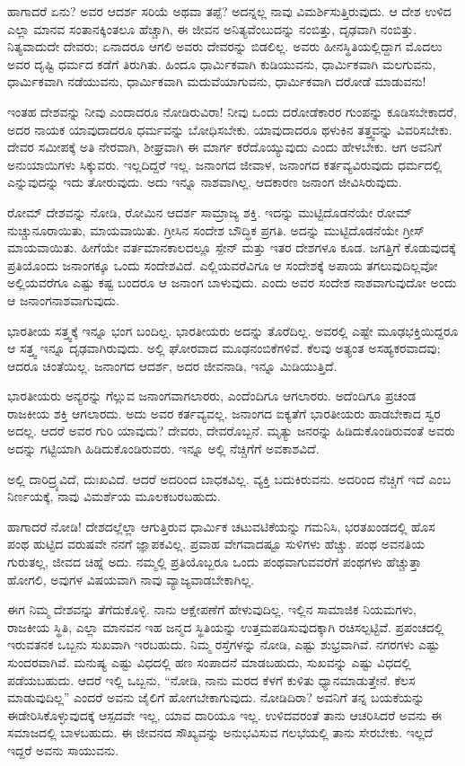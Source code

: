 ಹಾಗಾದರೆ ಏನು? ಅವರ ಆದರ್ಶ ಸರಿಯೆ ಅಥವಾ ತಪ್ಪೆ? ಅದನ್ನಲ್ಲ ನಾವು ವಿಮರ್ಶಿಸುತ್ತಿರುವುದು. ಆ ದೇಶ ಉಳಿದ ಎಲ್ಲಾ ಮಾನವ ಸಂತಾನಕ್ಕಿಂತಲೂ ಹೆಚ್ಚಾಗಿ, ಈ ಜೀವನ ಅನಿತ್ಯವೆಂಬುದನ್ನು ನಂಬಿತ್ತು, ದೃಢವಾಗಿ ನಂಬಿತ್ತು. ನಿತ್ಯವಾದುದೇ ದೇವರು; ಏನಾದರೂ ಆಗಲಿ ಅವರು ದೇವರನ್ನು ಬಿಡಲಿಲ್ಲ. ಅವರು ಹೀನಸ್ಥಿತಿಯಲ್ಲಿದ್ದಾಗ ಮೊದಲು ಅವರ ದೃಷ್ಟಿ ಧರ್ಮದ ಕಡೆಗೆ ತಿರುಗಿತು. ಹಿಂದೂ ಧಾರ್ಮಿಕವಾಗಿ ಕುಡಿಯುವನು, ಧಾರ್ಮಿಕವಾಗಿ ಮಲಗುವನು, ಧಾರ್ಮಿಕವಾಗಿ ನಡೆಯುವನು, ಧಾರ್ಮಿಕವಾಗಿ ಮದುವೆಯಾಗುವನು, ಧಾರ್ಮಿಕವಾಗಿ ದರೋಡೆ ಮಾಡುವನು!

ಇಂತಹ ದೇಶವನ್ನು ನೀವು ಎಂದಾದರೂ ನೋಡಿರುವಿರಾ! ನೀವು ಒಂದು ದರೋಡೆಕಾರರ ಗುಂಪನ್ನು ಕೂಡಿಸಬೇಕಾದರೆ, ಅದರ ನಾಯಕ ಯಾವುದಾದರೂ ಧರ್ಮವನ್ನು ಬೋಧಿಸಬೇಕು. ಯಾವುದಾದರೂ ಥಳುಕಿನ ತತ್ತ್ವವನ್ನು ವಿವರಿಸಬೇಕು. ದೇವರ ಸಮೀಪಕ್ಕೆ ಅತಿ ನೇರವಾಗಿ, ಶೀಘ್ರವಾಗಿ ಈ ಮಾರ್ಗ ಕರೆದೊಯ್ಯುವುದು ಎಂದು ಹೇಳಬೇಕು. ಆಗ ಅವನಿಗೆ ಅನುಯಾಯಿಗಳು ಸಿಕ್ಕುವರು. ಇಲ್ಲದಿದ್ದರೆ ಇಲ್ಲ. ಜನಾಂಗದ ಜೀವಾಳ, ಜನಾಂಗದ ಕರ್ತವ್ಯವಿರುವುದು ಧರ್ಮದಲ್ಲಿ ಎನ್ನುವುದನ್ನು ಇದು ತೋರುವುದು. ಅದು ಇನ್ನೂ ನಾಶವಾಗಿಲ್ಲ. ಆದಕಾರಣ ಜನಾಂಗ ಜೀವಿಸಿರುವುದು.

ರೋಮ್ ದೇಶವನ್ನು ನೋಡಿ, ರೋಮಿನ ಆದರ್ಶ ಸಾಮ್ರಾಜ್ಯ ಶಕ್ತಿ. ಇದನ್ನು ಮುಟ್ಟಿದೊಡನೆಯೇ ರೋಮ್ ನುಚ್ಚುನೂರಾಯಿತು, ಮಾಯವಾಯಿತು. ಗ್ರೀಸಿನ ಸಂದೇಶ ಬೌದ್ಧಿಕ ಪ್ರಗತಿ. ಅದನ್ನು ಮುಟ್ಟಿದೊಡನೆಯೇ ಗ್ರೀಸ್ ಮಾಯವಾಯಿತು. ಹೀಗೆಯೇ ವರ್ತಮಾನಕಾಲದಲ್ಲೂ ಸ್ಪೇನ್ ಮತ್ತು ಇತರ ದೇಶಗಳೂ ಕೂಡ. ಜಗತ್ತಿಗೆ ಕೊಡುವುದಕ್ಕೆ ಪ್ರತಿಯೊಂದು ಜನಾಂಗಕ್ಕೂ ಒಂದು ಸಂದೇಶವಿದೆ. ಎಲ್ಲಿಯವರೆವಿಗೂ ಆ ಸಂದೇಶಕ್ಕೆ ಅಪಾಯ ತಗಲುವುದಿಲ್ಲವೋ ಅಲ್ಲಿಯವರೆಗೂ ಎಷ್ಟು ಕಷ್ಟ ಬಂದರೂ ಆ ಜನಾಂಗ ಬಾಳುವುದು. ಎಂದು ಅವರ ಸಂದೇಶ ನಾಶವಾಗುವುದೋ ಅಂದು ಆ ಜನಾಂಗ\break ನಾಶವಾಗುವುದು.

ಭಾರತೀಯ ಸತ್ತ್ವಕ್ಕೆ ಇನ್ನೂ ಭಂಗ ಬಂದಿಲ್ಲ. ಭಾರತೀಯರು ಅದನ್ನು ತೊರೆದಿಲ್ಲ. ಅವರಲ್ಲಿ ಎಷ್ಟೇ ಮೂಢಭಕ್ತಿಯಿದ್ದರೂ ಆ ಸತ್ತ್ವ ಇನ್ನೂ ದೃಢವಾಗಿರುವುದು. ಅಲ್ಲಿ ಘೋರವಾದ ಮೂಢನಂಬಿಕೆಗಳಿವೆ. ಕೆಲವು ಅತ್ಯಂತ ಅಸಹ್ಯಕರವಾದವು; ಆದರೂ ಚಿಂತೆಯಿಲ್ಲ. ಜನಾಂಗದ ಆದರ್ಶ, ಅದರ ಜೀವನಾಡಿ, ಇನ್ನೂ ಮಿಡಿಯುತ್ತಿದೆ.

ಭಾರತೀಯರು ಅನ್ಯರನ್ನು ಗೆಲ್ಲುವ ಜನಾಂಗವಾಗಲಾರರು, ಎಂದೆಂದಿಗೂ ಆಗಲಾರರು. ಅದೆಂದಿಗೂ ಪ್ರಚಂಡ ರಾಜಕೀಯ ಶಕ್ತಿ ಆಗಲಾರದು. ಅದು ಅವರ ಕರ್ತವ್ಯವಲ್ಲ. ಜನಾಂಗದ ಐಕ್ಯತೆಗೆ ಭಾರತೀಯರು ಹಾಡಬೇಕಾದ ಸ್ವರ ಅದಲ್ಲ. ಆದರೆ ಅವರ ಗುರಿ ಯಾವುದು? ದೇವರು, ದೇವರೊಬ್ಬನೆ. ಮೃತ್ಯು ಜನರನ್ನು ಹಿಡಿದುಕೊಂಡಿರುವಂತೆ ಅವರು ಅದನ್ನು ಗಟ್ಟಿಯಾಗಿ ಹಿಡಿದುಕೊಂಡಿರುವರು. ಇನ್ನೂ ಅಲ್ಲಿ ನೆಚ್ಚಿಗೆಗೆ ಅವಕಾಶವಿದೆ.

ಅಲ್ಲಿ ದಾರಿದ್ರ್ಯವಿದೆ, ದುಃಖವಿದೆ. ಆದರೆ ಅದರಿಂದ ಬಾಧಕವಿಲ್ಲ. ವ್ಯಕ್ತಿ ಬದುಕಿರುವನು. ಅದರಿಂದ ನೆಚ್ಚಿಗೆ ಇದೆ ಎಂಬ ನಿರ್ಣಯಕ್ಕೆ, ನಾವು ವಿಮರ್ಶೆಯ ಮೂಲಕ\break ಬರಬಹುದು.

ಹಾಗಾದರೆ ನೋಡಿ! ದೇಶದಲ್ಲೆಲ್ಲಾ ಆಗುತ್ತಿರುವ ಧಾರ್ಮಿಕ ಚಟುವಟಿಕೆಯನ್ನು ಗಮನಿಸಿ, ಭರತಖಂಡದಲ್ಲಿ ಹೊಸ ಪಂಥ ಹುಟ್ಟಿದ ವರುಷವೇ ನನಗೆ ಜ್ಞಾಪಕವಿಲ್ಲ. ಪ್ರವಾಹ ವೇಗವಾದಷ್ಟೂ ಸುಳಿಗಳು ಹೆಚ್ಚು. ಪಂಥ ಅವನತಿಯ ಗುರುತಲ್ಲ, ಜೀವದ ಚಿಹ್ನೆ ಅದು. ನಮ್ಮಲ್ಲಿ ಪ್ರತಿಯೊಬ್ಬರೂ ಒಂದು ಪಂಥವಾಗುವವರೆಗೆ ಪಂಥಗಳು ಹೆಚ್ಚುತ್ತಾ ಹೋಗಲಿ, ಅವುಗಳ ವಿಷಯವಾಗಿ ನಾವು ವ್ಯಾಜ್ಯವಾಡಬೇಕಾಗಿಲ್ಲ.

ಈಗ ನಿಮ್ಮ ದೇಶವನ್ನು ತೆಗೆದುಕೊಳ್ಳಿ. ನಾನು ಆಕ್ಷೇಪಣೆಗೆ ಹೇಳುವುದಿಲ್ಲ. ಇಲ್ಲಿನ ಸಾಮಾಜಿಕ ನಿಯಮಗಳು, ರಾಜಕೀಯ ಸ್ಥಿತಿ, ಎಲ್ಲಾ ಮಾನವನ ಇಹ ಜನ್ಮದ ಸ್ಥಿತಿಯನ್ನು ಉತ್ತಮಪಡಿಸುವುದಕ್ಕಾಗಿ ರಚಿಸಲ್ಪಟ್ಟಿವೆ. ಪ್ರಪಂಚದಲ್ಲಿ ಇರುವತನಕ ಒಬ್ಬನು ಸುಖವಾಗಿ ಇರಬಹುದು. ನಿಮ್ಮ ರಸ್ತೆಗಳನ್ನು ನೋಡಿ, ಎಷ್ಟು ಶುಭ್ರವಾಗಿವೆ. ನಗರಗಳು ಎಷ್ಟು ಸುಂದರವಾಗಿವೆ. ಮನುಷ್ಯ ಎಷ್ಟು ವಿಧದಲ್ಲಿ ಹಣ ಸಂಪಾದನೆ ಮಾಡಬಹುದು, ಸುಖವನ್ನು ಎಷ್ಟು ವಿಧದಲ್ಲಿ ಪಡೆಯಬಹುದು. ಆದರೆ ಇಲ್ಲಿ ಒಬ್ಬನು, “ನೋಡಿ, ನಾನು ಮರದ ಕೆಳಗೆ ಕುಳಿತು ಧ್ಯಾನಮಾಡುತ್ತೇನೆ. ಕೆಲಸ ಮಾಡುವುದಿಲ್ಲ” ಎಂದರೆ ಅವನು ಜೈಲಿಗೆ ಹೋಗಬೇಕಾಗುವುದು. ನೋಡಿದಿರಾ? ಅವನಿಗೆ ತನ್ನ ಬಯಕೆಯನ್ನು ಈಡೇರಿಸಿಕೊಳ್ಳುವುದಕ್ಕೆ ಆಸ್ಪದವೇ ಇಲ್ಲ, ಯಾವ ದಾರಿಯೂ ಇಲ್ಲ. ಉಳಿದವರಂತೆ ತಾನು ಆಚರಿಸಿದರೆ ಅವನು ಈ ಸಮಾಜದಲ್ಲಿ ಬಾಳಬಹುದು. ಈ ಜೀವನದ ಸೌಖ್ಯವನ್ನು ಅನುಭವಿಸುವ ಗಲಭೆಯಲ್ಲಿ ತಾನು ಸೇರಬೇಕು. ಇಲ್ಲದೆ ಇದ್ದರೆ ಅವನು ಸಾಯುವನು.

